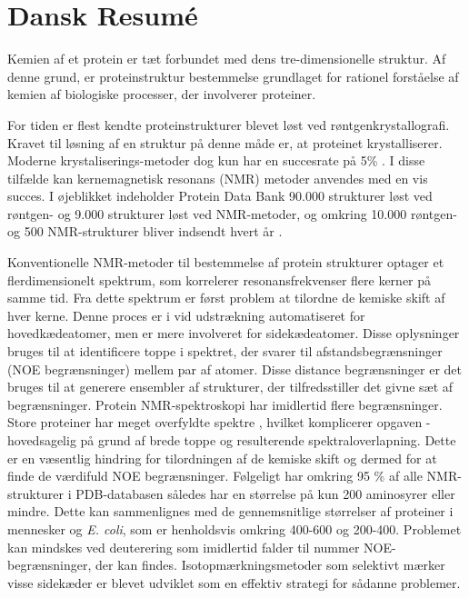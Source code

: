 \chapter*{Dansk Resumé}

Kemien af et protein er tæt forbundet med dens tre-dimensionelle struktur. Af denne grund, er proteinstruktur bestemmelse grundlaget for rationel forståelse af kemien af biologiske processer, der involverer proteiner.

For tiden er flest kendte proteinstrukturer blevet løst ved røntgenkrystallografi. Kravet til løsning af en struktur på denne måde er, at proteinet krystalliserer. Moderne krystaliserings-metoder dog kun har en succesrate på 5\% \cite{xray}. I disse tilfælde kan kernemagnetisk resonans (NMR) metoder anvendes med en vis succes.
I øjeblikket indeholder Protein Data Bank 90.000 strukturer løst ved røntgen- og 9.000 strukturer løst ved NMR-metoder, og omkring 10.000 røntgen- og 500 NMR-strukturer bliver indsendt hvert år \cite{PDB}.

Konventionelle NMR-metoder til bestemmelse af protein strukturer optager et flerdimensionelt spektrum, som korrelerer resonansfrekvenser flere kerner på samme tid.
Fra dette spektrum er først problem at tilordne de kemiske skift af hver kerne. Denne proces er i vid udstrækning automatiseret for hovedkædeatomer, men er mere involveret for sidekædeatomer.  Disse  oplysninger bruges til at identificere toppe i spektret, der svarer til afstandsbegrænsninger (NOE begrænsninger) mellem par af atomer. Disse distance begrænsninger er det bruges til at generere ensembler af strukturer, der tilfredsstiller det givne sæt af begrænsninger.
Protein NMR-spektroskopi har imidlertid flere begrænsninger. Store proteiner har meget overfyldte spektre , hvilket komplicerer opgaven - hovedsagelig på grund af brede toppe og resulterende spektraloverlapning.
Dette er en væsentlig hindring for tilordningen af de kemiske skift og dermed for at finde de
værdifuld NOE begrænsninger. Følgeligt har omkring 95 \% af alle NMR- strukturer i PDB-databasen således har en størrelse på kun 200 aminosyrer eller mindre. Dette kan sammenlignes med de gennemsnitlige størrelser af proteiner i mennesker og \textit{E. coli}, som er henholdsvis omkring 400-600 og 200-400. Problemet kan mindskes ved deuterering  som imidlertid falder til nummer NOE-begrænsninger, der kan findes. Isotopmærkningsmetoder som selektivt mærker visse sidekæder er blevet udviklet som en effektiv strategi for sådanne problemer.

